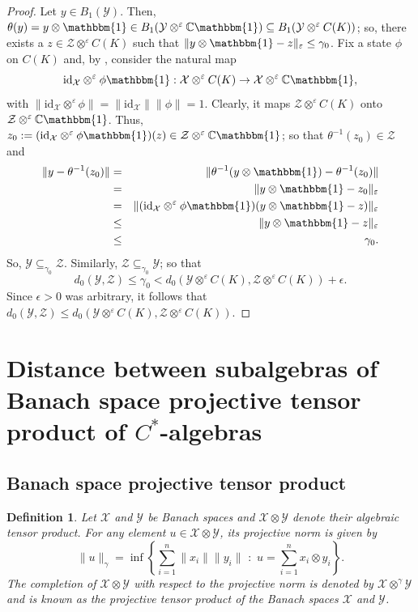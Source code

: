 \documentclass{amsart}
\numberwithin{equation}{section}
\newcommand{\mcal}{\mathcal}
\newcommand{\1}{\mathbf{1}}
\newtheorem{definition}[theorem]{Definition}
\begin{document}
\begin{proof}
Let $y \in B_{1}(\mcal{Y})$. Then, $\theta(y)= y\otimes \mathbbm{1}
\in B_{1}(\mcal{Y} \otimes^{\varepsilon}
\mathbb{C}\mathbbm{1})\subseteq B_{1}(\mcal{Y} \otimes^{\varepsilon}
C(K))$; so, there exists a $z\in \mcal{Z} \otimes^{\varepsilon} C(K)$
such that $\|y\otimes \mathbbm{1}-z\|_{\varepsilon}\leq \gamma_{0}$.
Fix a state $\phi$ on $C(K)$ and, by , consider the
natural map
$$ \mathrm{id}_{\mcal{X}}\otimes^{\varepsilon} \phi \mathbbm{1}:
\mcal{X} \otimes^{\varepsilon} C(K) \to \mcal{X} \otimes^{\varepsilon}
\mathbb{C}\mathbbm{1},
$$ with $\|\mathrm{id}_{\mcal{X}}\otimes^{\varepsilon} \phi\|=
\|\mathrm{id}_{\mcal{X}}\|\| \phi \|= 1$.  Clearly, it maps
$\mcal{Z}\otimes^{\varepsilon} C(K)$ onto
$\mcal{Z}\otimes^{\varepsilon} \mathbb{C}\mathbbm{1}$. Thus, $z_{0}:=
(\mathrm{id}_{\mcal{X}}\otimes^{\varepsilon} \phi \mathbbm{1})(z)\in
\mcal{Z} \otimes^{\varepsilon} \mathbb{C}\mathbbm{1}$; so that $\theta^{-1}(z_0) \in \mcal{Z}$  and
\begin{eqnarray*}
\|y-\theta^{-1}(z_{0})\| &=& \|\theta^{-1}(y\otimes \mathbbm{1})-\theta^{-1}(z_{0})\| \\
&=& \|y\otimes \mathbbm{1}- z_{0}\|_{\varepsilon}\\
&=&\|(\mathrm{id}_{\mcal{X}}\otimes^{\varepsilon} \phi \mathbbm{1})(y\otimes \mathbbm{1}-z)\|_{\varepsilon}\\
&\leq & \|y\otimes \mathbbm{1}-z\|_{\varepsilon}\\
& \leq & \gamma_{0}.
\end{eqnarray*}
So, $\mcal{Y} \subseteq_{\gamma_{0}}\mcal{Z}$.
Similarly,  $\mcal{Z}\subseteq_{\gamma_{0}}\mcal{Y}$; 
so that 
\[
d_{0}(\mcal{Y}, \mcal{Z})\leq \gamma_{0}< d_{0}(\mcal{Y} \otimes^{\varepsilon} C(K), \mcal{Z}\otimes^{\varepsilon} C(K))+ \epsilon.
\]
Since $\epsilon>0$ was arbitrary, it follows that
\(
d_{0}(\mcal{Y}, \mcal{Z})\leq  d_{0}(\mcal{Y} \otimes^{\varepsilon} C(K), \mcal{Z}\otimes^{\varepsilon} C(K)).
\) 
\end{proof}

\section{Distance between subalgebras of Banach space projective tensor product of $C^*$-algebras}\label{projective}
\subsection{Banach space projective tensor product}
\begin{definition}
Let $\mcal{X}$ and $\mcal{Y}$ be Banach spaces and $\mcal{X}\otimes \mcal{Y}$ denote their algebraic tensor product. For any element 
$u \in \mcal{X}\otimes \mcal{Y}$, its projective norm is given by 
$$
\|u\|_{\gamma} = \inf \left\{
  \sum_{i=1}^{n}\|x_{i}\|\|y_{i}\|\,\, :\,\,
 u= \sum_{i=1}^{n} x_{i}\otimes y_{i}
  \right\}.
$$ The completion of $\mcal{X}\otimes \mcal{Y}$ with respect to the
  projective norm is denoted by $\mcal{X} \otimes^{\gamma} \mcal{Y}$
  and is known as the projective tensor product of the Banach spaces
  $\mcal{X}$ and $\mcal{Y}$.
\end{definition}
\end{document}
